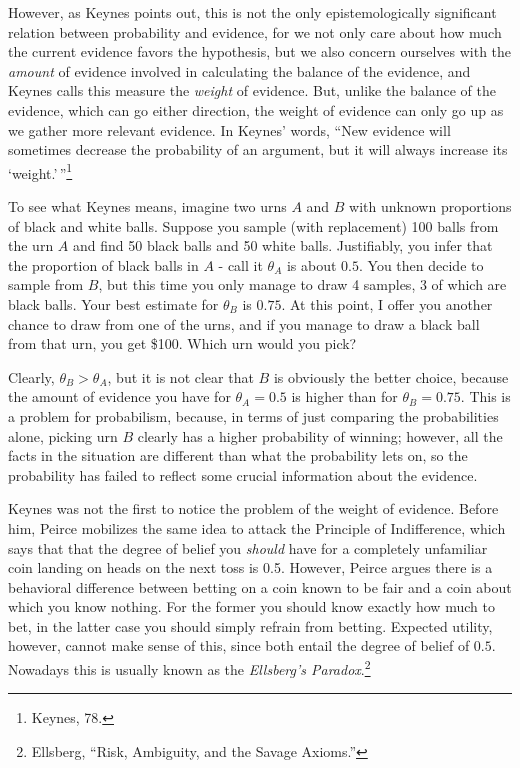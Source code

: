 However, as Keynes points out, this is not the only epistemologically
significant relation between probability and evidence, for we not only
care about how much the current evidence favors the hypothesis, but we
also concern ourselves with the \emph{amount} of evidence involved in
calculating the balance of the evidence, and Keynes calls this measure
the \emph{weight} of evidence. But, unlike the balance of the evidence,
which can go either direction, the weight of evidence can only go up as
we gather more relevant evidence. In Keynes' words, ``New evidence will
sometimes decrease the probability of an argument, but it will always
increase its `weight.'\,''\footnote{Keynes, 78.}

To see what Keynes means, imagine two urns \(A\) and \(B\) with unknown
proportions of black and white balls. Suppose you sample (with
replacement) 100 balls from the urn \(A\) and find 50 black balls and 50
white balls. Justifiably, you infer that the proportion of black balls
in \(A\) - call it \(\theta_A\) is about \(0.5\). You then decide to
sample from \(B\), but this time you only manage to draw 4 samples, 3 of
which are black balls. Your best estimate for \(\theta_B\) is \(0.75\).
At this point, I offer you another chance to draw from one of the urns,
and if you manage to draw a black ball from that urn, you get \$100.
Which urn would you pick?

Clearly, \(\theta_B > \theta_A\), but it is not clear that \(B\) is
obviously the better choice, because the amount of evidence you have for
\(\theta_A = 0.5\) is higher than for \(\theta_B = 0.75\). This is a
problem for probabilism, because, in terms of just comparing the
probabilities alone, picking urn \(B\) clearly has a higher probability
of winning; however, all the facts in the situation are different than
what the probability lets on, so the probability has failed to reflect
some crucial information about the evidence.

Keynes was not the first to notice the problem of the weight of
evidence. Before him, Peirce mobilizes the same idea to attack the Principle of Indifference, which says that that the degree of belief you \emph{should} have for a completely unfamiliar coin landing on heads on the next toss is 0.5. However,
Peirce argues there is a behavioral difference between betting on a coin known to be fair and a coin about which you know nothing. For the former you should know exactly how
much to bet, in the latter case you should simply refrain from betting.
Expected utility, however, cannot make sense of this, since both
entail the degree of belief of \(0.5\). Nowadays this is usually known
as the \emph{Ellsberg's Paradox}.\footnote{Ellsberg, ``Risk, Ambiguity,
  and the Savage Axioms.''}

